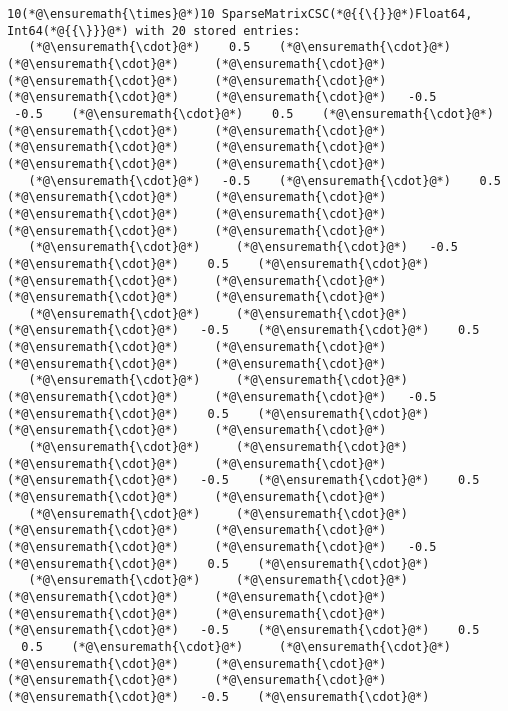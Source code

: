 \documentclass[12pt,a4paper]{article}
\begin{document}
\begin{lstlisting}
10(*@\ensuremath{\times}@*)10 SparseMatrixCSC(*@{{\{}}@*)Float64, Int64(*@{{\}}}@*) with 20 stored entries:
   (*@\ensuremath{\cdot}@*)    0.5    (*@\ensuremath{\cdot}@*)     (*@\ensuremath{\cdot}@*)     (*@\ensuremath{\cdot}@*)     (*@\ensuremath{\cdot}@*)     (*@\ensuremath{\cdot}@*)     (*@\ensuremath{\cdot}@*)     (*@\ensuremath{\cdot}@*)   -0.5
 -0.5    (*@\ensuremath{\cdot}@*)    0.5    (*@\ensuremath{\cdot}@*)     (*@\ensuremath{\cdot}@*)     (*@\ensuremath{\cdot}@*)     (*@\ensuremath{\cdot}@*)     (*@\ensuremath{\cdot}@*)     (*@\ensuremath{\cdot}@*)     (*@\ensuremath{\cdot}@*) 
   (*@\ensuremath{\cdot}@*)   -0.5    (*@\ensuremath{\cdot}@*)    0.5    (*@\ensuremath{\cdot}@*)     (*@\ensuremath{\cdot}@*)     (*@\ensuremath{\cdot}@*)     (*@\ensuremath{\cdot}@*)     (*@\ensuremath{\cdot}@*)     (*@\ensuremath{\cdot}@*) 
   (*@\ensuremath{\cdot}@*)     (*@\ensuremath{\cdot}@*)   -0.5    (*@\ensuremath{\cdot}@*)    0.5    (*@\ensuremath{\cdot}@*)     (*@\ensuremath{\cdot}@*)     (*@\ensuremath{\cdot}@*)     (*@\ensuremath{\cdot}@*)     (*@\ensuremath{\cdot}@*) 
   (*@\ensuremath{\cdot}@*)     (*@\ensuremath{\cdot}@*)     (*@\ensuremath{\cdot}@*)   -0.5    (*@\ensuremath{\cdot}@*)    0.5    (*@\ensuremath{\cdot}@*)     (*@\ensuremath{\cdot}@*)     (*@\ensuremath{\cdot}@*)     (*@\ensuremath{\cdot}@*) 
   (*@\ensuremath{\cdot}@*)     (*@\ensuremath{\cdot}@*)     (*@\ensuremath{\cdot}@*)     (*@\ensuremath{\cdot}@*)   -0.5    (*@\ensuremath{\cdot}@*)    0.5    (*@\ensuremath{\cdot}@*)     (*@\ensuremath{\cdot}@*)     (*@\ensuremath{\cdot}@*) 
   (*@\ensuremath{\cdot}@*)     (*@\ensuremath{\cdot}@*)     (*@\ensuremath{\cdot}@*)     (*@\ensuremath{\cdot}@*)     (*@\ensuremath{\cdot}@*)   -0.5    (*@\ensuremath{\cdot}@*)    0.5    (*@\ensuremath{\cdot}@*)     (*@\ensuremath{\cdot}@*) 
   (*@\ensuremath{\cdot}@*)     (*@\ensuremath{\cdot}@*)     (*@\ensuremath{\cdot}@*)     (*@\ensuremath{\cdot}@*)     (*@\ensuremath{\cdot}@*)     (*@\ensuremath{\cdot}@*)   -0.5    (*@\ensuremath{\cdot}@*)    0.5    (*@\ensuremath{\cdot}@*) 
   (*@\ensuremath{\cdot}@*)     (*@\ensuremath{\cdot}@*)     (*@\ensuremath{\cdot}@*)     (*@\ensuremath{\cdot}@*)     (*@\ensuremath{\cdot}@*)     (*@\ensuremath{\cdot}@*)     (*@\ensuremath{\cdot}@*)   -0.5    (*@\ensuremath{\cdot}@*)    0.5
  0.5    (*@\ensuremath{\cdot}@*)     (*@\ensuremath{\cdot}@*)     (*@\ensuremath{\cdot}@*)     (*@\ensuremath{\cdot}@*)     (*@\ensuremath{\cdot}@*)     (*@\ensuremath{\cdot}@*)     (*@\ensuremath{\cdot}@*)   -0.5    (*@\ensuremath{\cdot}@*)
\end{lstlisting}
\end{document}

